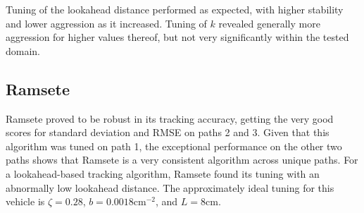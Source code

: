 \documentclass[mla8alt]{mla}
\begin{document}
\begin{paper}
\begin{figure}[H]
\endminipage
\end{figure}

Tuning of the lookahead distance performed as expected, with higher stability and lower aggression as it increased. Tuning of $k$ revealed generally more aggression for higher values thereof, but not very significantly within the tested domain. 

\subsection{Ramsete}

Ramsete proved to be robust in its tracking accuracy, getting the very good scores for standard deviation and RMSE on paths 2 and 3. Given that this algorithm was tuned on path 1, the exceptional performance on the other two paths shows that Ramsete is a very consistent algorithm across unique paths. For a lookahead-based tracking algorithm, Ramsete found its tuning with an abnormally low lookahead distance. The approximately ideal tuning for this vehicle is $\zeta=0.28$, $b=0.0018\text{cm}^{-2}$, and $L=8$cm.


\end{paper}
\end{document}
